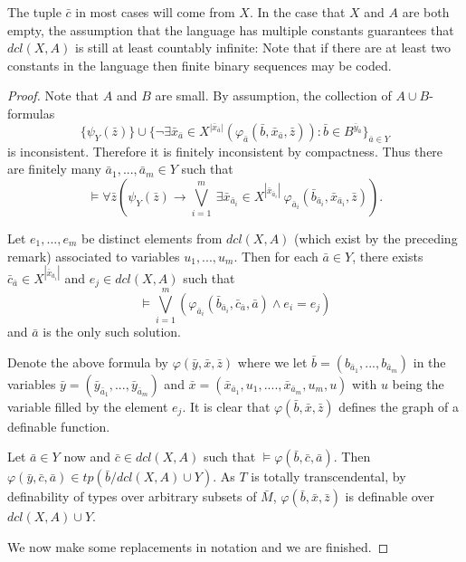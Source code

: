 \documentclass[10pt,a4paper]{amsart}
\def \tp {tp}
\begin{document}
\begin{remark}
The tuple $\bar{c}$ in most cases will come from $X$. In the case that $X$ and $A$ are both empty, the assumption that the language has multiple constants guarantees that $dcl(X,A)$ is still at least countably infinite: Note that if there are at least two constants in the language then finite binary sequences may be coded.
\end{remark}

\begin{proof}
Note that $A$ and $B$ are small.  By assumption, the collection of $A\cup B$-formulas $$\{\psi_Y(\bar{z})\} \cup \{\neg \exists \bar{x}_{\bar{a}} \in X^{|\bar{x}_{\bar{a}}|}(\varphi_{\bar{a}}(\bar{b},\bar{x}_{\bar{a}},\bar{z})) : \bar{b} \in B^{\bar{y}_{\bar{a}}}\}_{\bar{a} \in Y}$$ is inconsistent. Therefore it is finitely inconsistent by compactness. Thus there are finitely many $\bar{a}_1,...,\bar{a}_m \in Y$ such that $$\models \forall \bar{z} \left( \psi_Y(\bar{z}) \rightarrow \bigvee_{i=1}^m \ \exists \bar{x}_{\bar{a}_i} \in X^{|\bar{x}_{\bar{a}_i}|} \  \varphi_{\bar{a}_i}(\bar{b}_{\bar{a}_i},\bar{x}_{\bar{a}_i},\bar{z})\right).$$ 

Let $e_1,...,e_m$ be distinct elements from $dcl(X,A)$ (which exist by the preceding remark) associated to variables $u_1,...,u_m$. Then for each $\bar{a} \in Y$, there exists $\bar{c}_{\bar{a}} \in X^{|\bar{x}_{\bar{a}_i}|}$ and $e_j \in dcl(X,A)$ such that $$\models\bigvee_{i=1}^m (\varphi_{\bar{a}_i}(\bar{b}_{\bar{a}_i},\bar{c}_{\bar{a}},\bar{a}) \wedge e_i=e_j)$$ and $\bar{a}$ is the only such solution.

Denote the above formula by $\varphi(\bar{y},\bar{x},\bar{z})$ where
we let $\bar{b} =(b_{\bar{a}_1},...,b_{\bar{a}_m})$ in the variables $\bar{y} = (\bar{y}_{\bar{a}_1},...,\bar{y}_{\bar{a}_m})$ and $\bar{x} = (\bar{x}_{\bar{a}_1},u_1,....,\bar{x}_{\bar{a}_m},u_m, u)$ with $u$ being the variable filled by the element $e_j$. It is clear that $\varphi(\bar{b}, \bar{x},\bar{z})$ defines the graph of a definable function.

Let $\bar{a} \in Y$ now and $\bar{c} \in dcl(X,A)$ such that $\models \varphi(\bar{b},\bar{c},\bar{a})$. Then $\varphi(\bar{y},\bar{c},\bar{a}) \in \tp(\bar{b}/dcl(X,A)\cup Y)$. As $T$ is totally transcendental, by definability of types over arbitrary subsets of $\bar{M}$, $\varphi(\bar{b},\bar{x},\bar{z})$ is definable over $dcl(X,A) \cup Y$. 

We now make some replacements in notation and we are finished. 


\end{proof}
\end{document}
